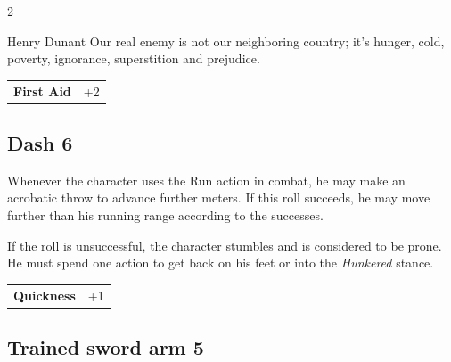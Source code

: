 \begin{multicols}{2}
\begin{tcolorbox}
\begin{pquote}{Henry Dunant}
Our real enemy is not our neighboring country; it's hunger, cold, poverty, ignorance, superstition and prejudice.
\end{pquote}

\vspace{3mm}

\begin{tabular}{@{}ll@{}}
    \textbf{First Aid} & +2\\
\end{tabular}


\end{tcolorbox}

\begin{tcolorbox}
    \subsection*{Dash \hfill \small{6 }}
    \tcblower
Whenever the character uses the Run action in combat, he may make an acrobatic throw to advance further meters. If this roll succeeds, he may move further than his running range according to the successes. 

If the roll is unsuccessful, the character stumbles and is considered to be prone. He must spend one action to get back on his feet or into the \textit{Hunkered} stance.


\vspace{3mm}

\begin{tabular}{@{}ll@{}}
    \textbf{Quickness} & +1\\
\end{tabular}


\end{tcolorbox}

\begin{tcolorbox}
    \subsection*{Trained sword arm \hfill \small{5 }}
    \tcblower



\end{tcolorbox}
\end{multicols}
